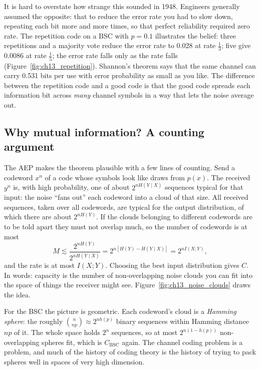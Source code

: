 It is hard to overstate how strange this sounded in 1948. Engineers generally assumed the
opposite: that to reduce the error rate you had to slow down, repeating each bit more and more
times, so that perfect reliability required zero rate. The repetition code on a BSC with $p=0.1$
illustrates the belief: three repetitions and a majority vote reduce the error rate to 0.028 at
rate $\frac13$; five give 0.0086 at rate $\frac15$; the error rate falls only as the rate falls
(Figure~\ref{fig:ch13_repetition}). Shannon's theorem says that the same channel can carry 0.531
bits per use with error probability as small as you like. The difference between the repetition
code and a good code is that the good code spreads each information bit across \emph{many} channel
symbols in a way that lets the noise average out.

\subsection{Why mutual information? A counting argument}

The AEP makes the theorem plausible with a few lines of counting. Send a codeword $x^n$ of a code
whose symbols look like draws from $p(x)$. The received $y^n$ is, with high probability, one of
about $2^{nH(Y\mid X)}$ sequences typical for that input: the noise ``fans out'' each codeword
into a cloud of that size. All received sequences, taken over all codewords, are typical for the
output distribution, of which there are about $2^{nH(Y)}$. If the clouds belonging to different
codewords are to be told apart they must not overlap much, so the number of codewords is at most
\begin{equation}
M\lesssim\frac{2^{nH(Y)}}{2^{nH(Y\mid X)}}=2^{n[H(Y)-H(Y\mid X)]}=2^{nI(X;Y)},
\label{eq:ch13:count}
\end{equation}
and the rate is at most $I(X;Y)$. Choosing the best input distribution gives $C$. In words:
capacity is the number of non-overlapping noise clouds you can fit into the space of things the
receiver might see. Figure~\ref{fig:ch13_noise_clouds} draws the idea.


For the BSC the picture is geometric. Each codeword's cloud is a \emph{Hamming sphere}: the
roughly $\binom{n}{np}\approx2^{nh(p)}$ binary sequences within Hamming distance $np$ of it. The whole
space holds $2^n$ sequences, so at most $2^{n(1-h(p))}$ non-overlapping spheres fit, which is
$C_{\text{BSC}}$ again. The channel coding problem is a  problem, and much of
the history of coding theory is the history of trying to pack spheres well in spaces of very high
dimension.

